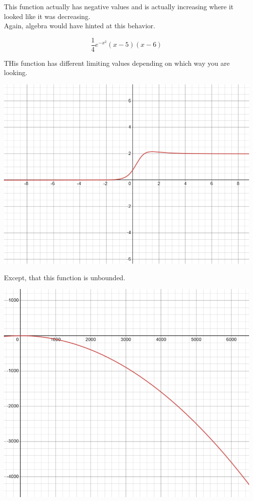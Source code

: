 \documentclass{ximera}
\begin{document}
\begin{example}
This function actually has negative values and is actually increasing where it looked like it was decreasing. \\


Again, algebra would have hinted at this behavior.

\[  \frac{1}{4} e^{-x^2} (x-5)(x-6)     \]


\end{example}










\begin{example}


THis function has different limiting values depending on which way you are looking.

\begin{image}
\includegraphics{pics/graph_4A.png}
\end{image}




Except, that this function is unbounded.

\begin{image}
\includegraphics{pics/graph_4B.png}
\end{image}



\end{example}
\end{document}

